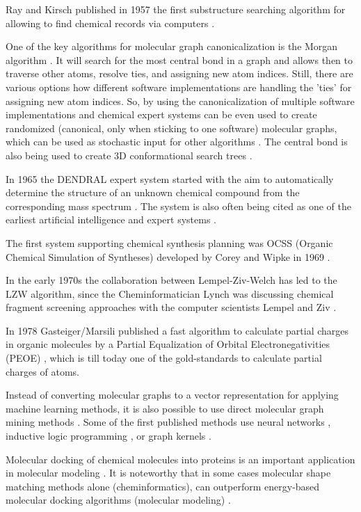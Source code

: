 \documentclass{sig-alternate}
\begin{document}
Ray and Kirsch published in 1957 the first substructure searching algorithm for allowing to find chemical records via computers \cite{RayKirsch1957}.

One of the key algorithms for molecular graph canonicalization is the Morgan algorithm \cite{Morgan1965}. It will search for the most central bond
in a graph and allows then to traverse other atoms, resolve ties, and assigning new atom indices. Still, there are various options how different 
software implementations are handling the 'ties' for assigning new atom indices. So, by using the canonicalization of multiple software implementations and chemical
expert systems can be even used to create randomized (canonical, only when sticking to one software) molecular graphs, which can be used as stochastic input for 
other algorithms \cite{cokfl06}. The central bond is also being used to create 3D conformational search trees \cite{Schwab2001}. 

In 1965 the DENDRAL expert system started with the aim to automatically determine the structure of an unknown chemical compound from the 
corresponding mass spectrum \cite{Gray1986}. The system is also often being cited as one of the earliest artificial intelligence and expert systems  \cite{Chen2006}.

The first system supporting chemical synthesis planning was OCSS (Organic Chemical Simulation of Syntheses) developed by Corey and Wipke in 1969 \cite{CoreyWipke1969}.

In the early 1970s the collaboration between Lempel-Ziv-Welch has led to the LZW algorithm, since the Cheminformatician Lynch was
discussing chemical fragment screening approaches with the computer scientists Lempel and Ziv \cite{brown2009}.

In 1978 Gasteiger/Marsili published a fast algorithm to calculate partial charges in organic molecules by a Partial Equalization of Orbital 
Electronegativities (PEOE) \cite{gm78}, which is till today one of the gold-standards to calculate partial charges of atoms.

Instead of converting molecular graphs to a vector representation for applying machine learning methods, it is also possible to use direct 
molecular graph mining methods \cite{okada2006}. Some of the first published methods use neural networks \cite{kireev1995}, 
inductive logic programming \cite{yh02a}, or graph kernels \cite{kti03}.

Molecular docking of chemical molecules into proteins is an important application in molecular modeling \cite{Leach2001}. It is noteworthy that in some cases
molecular shape matching methods alone (cheminformatics), can outperform energy-based molecular docking algorithms (molecular modeling) \cite{hsn07}.



\end{document}
